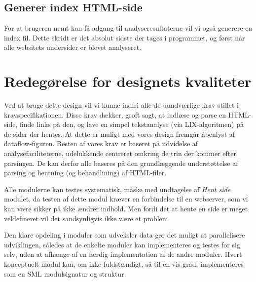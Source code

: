 \documentclass[a4paper,oneside,article, titlepage]{article}
\begin{document}
\subsection{Generer index HTML-side}
For at brugeren nemt kan få adgang til analyseresultaterne vil vi også
generere en index fil. Dette skridt er det absolut sidste der tages i
programmet, og først når alle websitets undersider er blevet
analyseret. 


\section{Redegørelse for designets kvaliteter}
Ved at bruge dette design vil vi kunne indfri alle de uundværlige krav
stillet i kravspecifikationen. Disse krav dækker, groft sagt, at
indlæse og parse en HTML-side, finde links på den, og lave en simpel
tekstanalyse (via LIX-algoritmen) på de sider der hentes. At dette er
muligt med vores design fremgår åbenlyst af dataflow-figuren. Resten
af vores krav er baseret på udvidelse af analysefaciliteterne,
udelukkende centreret omkring de trin der kommer efter parsingen. De
kan derfor alle baseres på den grundlæggende understøttelse af parsing
og hentning (og behandlining) af HTML-filer.

Alle modulerne kan testes systematisk, måske med undtagelse af
\textit{Hent side} modulet, da testen af dette modul kræver en
forbindelse til en webserver, som vi kan være sikker på ikke ændrer
indhold. Men fordi det at hente en side er meget veldefineret vil det
sandsynligvis ikke være et problem.

Den klare opdeling i moduler som udveksler data gør det muligt at
parallelisere udviklingen, således at de enkelte moduler kan
implementeres og testes for sig selv, uden at afhænge af en færdig
implementation af de andre moduler. Hvert konceptuelt modul kan, om
ikke fuldstændigt, så til en vis grad, implementeres som en SML
modulsignatur og struktur.
\end{document}
